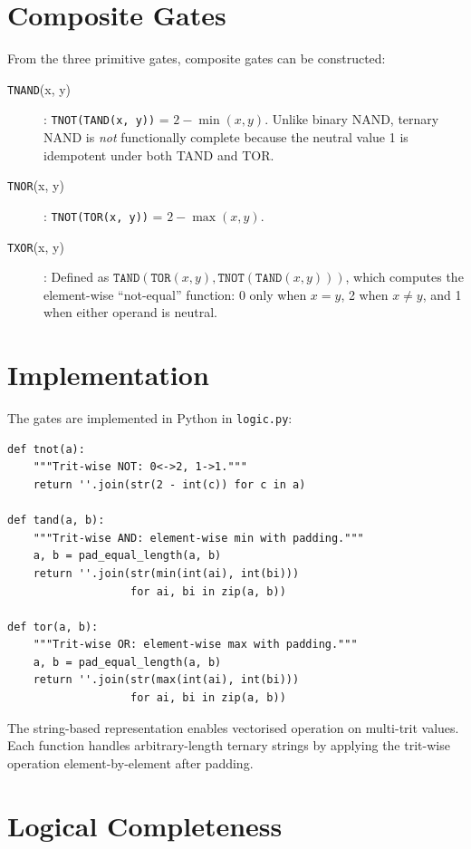 \documentclass[10pt,a4paper,twoside]{book}
\begin{document}
\section{Composite Gates}

From the three primitive gates, composite gates can be constructed:

\begin{description}
    \item[\texttt{TNAND}(x, y)]: \texttt{TNOT(TAND(x, y))} = $2 - \min(x, y)$.
          Unlike binary NAND, ternary NAND is \emph{not} functionally complete
          because the neutral value 1 is idempotent under both TAND and TOR.
    \item[\texttt{TNOR}(x, y)]: \texttt{TNOT(TOR(x, y))} = $2 - \max(x, y)$.
    \item[\texttt{TXOR}(x, y)]: Defined as $\texttt{TAND}(\texttt{TOR}(x,y),
          \texttt{TNOT}(\texttt{TAND}(x,y)))$, which computes the element-wise
          ``not-equal'' function: 0 only when $x = y$, 2 when $x \neq y$,
          and 1 when either operand is neutral.
\end{description}

\section{Implementation}

The gates are implemented in Python in \texttt{logic.py}:

\begin{lstlisting}
def tnot(a):
    """Trit-wise NOT: 0<->2, 1->1."""
    return ''.join(str(2 - int(c)) for c in a)

def tand(a, b):
    """Trit-wise AND: element-wise min with padding."""
    a, b = pad_equal_length(a, b)
    return ''.join(str(min(int(ai), int(bi)))
                   for ai, bi in zip(a, b))

def tor(a, b):
    """Trit-wise OR: element-wise max with padding."""
    a, b = pad_equal_length(a, b)
    return ''.join(str(max(int(ai), int(bi)))
                   for ai, bi in zip(a, b))
\end{lstlisting}

The string-based representation enables vectorised operation on multi-trit
values. Each function handles arbitrary-length ternary strings by applying
the trit-wise operation element-by-element after padding.

\section{Logical Completeness}
\end{document}
